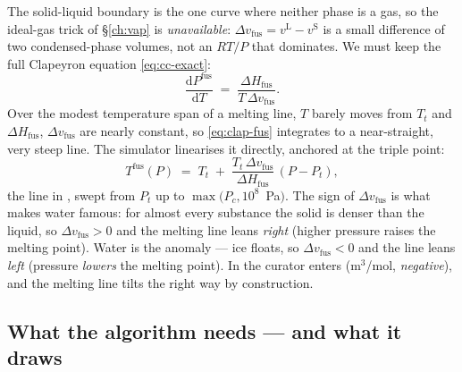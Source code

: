 \documentclass[11pt,a4paper]{article}
\newcommand{\Hfus}{\Delta H_{\!\mathrm{fus}}}
\begin{document}
The solid-liquid boundary is the one curve where neither phase is a
gas, so the ideal-gas trick of \S\ref{ch:vap} is \emph{unavailable}:
$\Delta v_{\mathrm{fus}}=v^{\mathrm{L}}-v^{\mathrm{S}}$ is a small
difference of two condensed-phase volumes, not an $RT/P$ that
dominates.  We must keep the full Clapeyron equation
\eqref{eq:cc-exact}:
\begin{equation}
   \frac{\mathrm{d}P^{\mathrm{fus}}}{\mathrm{d}T}
   \;=\; \frac{\Hfus}{T\,\Delta v_{\mathrm{fus}}} .
   \label{eq:clap-fus}
\end{equation}
Over the modest temperature span of a melting line, $T$ barely moves
from $T_t$ and $\Hfus$, $\Delta v_{\mathrm{fus}}$ are nearly constant,
so \eqref{eq:clap-fus} integrates to a near-straight, very steep line.
The simulator linearises it directly, anchored at the triple point:
\begin{equation}
   T^{\mathrm{fus}}(P) \;=\;
   T_t \;+\; \frac{T_t\,\Delta v_{\mathrm{fus}}}{\Hfus}\,(P - P_t),
   \label{eq:tfus}
\end{equation}
the line 
in , swept from $P_t$ up to $\max(P_c,10^8$~Pa$)$.
The sign of $\Delta v_{\mathrm{fus}}$ is what makes water famous: for
almost every substance the solid is denser than the liquid, so
$\Delta v_{\mathrm{fus}}>0$ and the melting line leans \emph{right}
(higher pressure raises the melting point).  Water is the anomaly ---
ice floats, so $\Delta v_{\mathrm{fus}}<0$ and the line leans
\emph{left} (pressure \emph{lowers} the melting point).  In
 the curator enters
 (m$^3$/mol, \emph{negative}), and the
melting line tilts the right way by construction.

\subsection{What the algorithm needs --- and what it draws}
\end{document}
